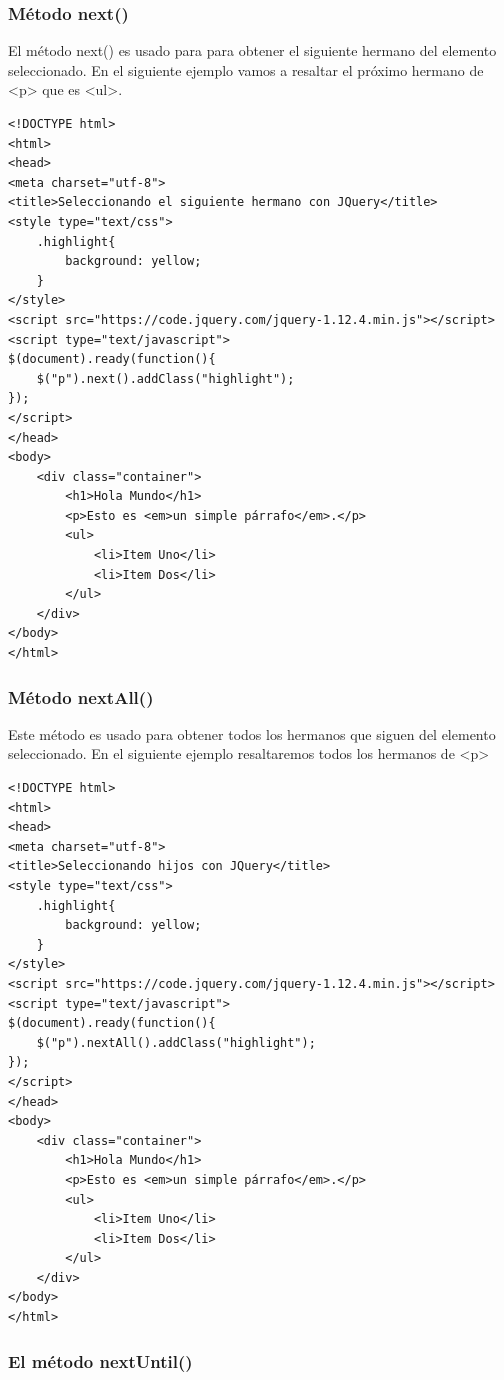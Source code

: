\documentclass[11pt]{article}
\begin{document}
\subsubsection*{Método next()}
\label{sec:org05ac013}

El método next() es usado para para obtener el siguiente hermano del elemento seleccionado. En el siguiente ejemplo vamos a resaltar el próximo hermano de <p> que es <ul>.

\begin{verbatim}
<!DOCTYPE html>
<html>
<head>
<meta charset="utf-8">
<title>Seleccionando el siguiente hermano con JQuery</title>
<style type="text/css">
    .highlight{
        background: yellow;
    }        
</style>
<script src="https://code.jquery.com/jquery-1.12.4.min.js"></script>
<script type="text/javascript">
$(document).ready(function(){
    $("p").next().addClass("highlight");
});
</script>
</head>
<body>
    <div class="container">
        <h1>Hola Mundo</h1>
        <p>Esto es <em>un simple párrafo</em>.</p>
        <ul>
            <li>Item Uno</li>
            <li>Item Dos</li>
        </ul>
    </div>
</body>
</html>                                		
\end{verbatim}

\subsubsection*{Método nextAll()}
\label{sec:org15a39a0}

Este método es usado para obtener todos los hermanos que siguen del elemento seleccionado. En el siguiente ejemplo resaltaremos todos los hermanos de <p>

\begin{verbatim}
<!DOCTYPE html>
<html>
<head>
<meta charset="utf-8">
<title>Seleccionando hijos con JQuery</title>
<style type="text/css">
    .highlight{
        background: yellow;
    }        
</style>
<script src="https://code.jquery.com/jquery-1.12.4.min.js"></script>
<script type="text/javascript">
$(document).ready(function(){
    $("p").nextAll().addClass("highlight");
});
</script>
</head>
<body>
    <div class="container">
        <h1>Hola Mundo</h1>
        <p>Esto es <em>un simple párrafo</em>.</p>
        <ul>
            <li>Item Uno</li>
            <li>Item Dos</li>
        </ul>
    </div>
</body>
</html>                                		
\end{verbatim}

\subsubsection*{El método nextUntil()}
\label{sec:orgcfa8f9e}
\end{document}
